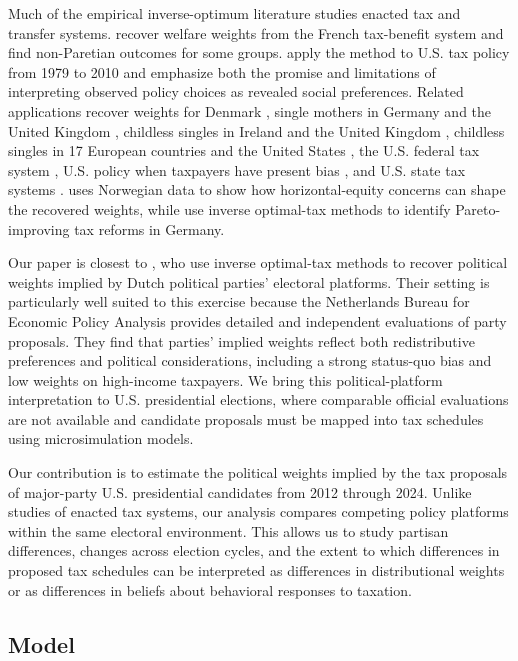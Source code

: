 \documentclass[12pt]{article}
\begin{document}
Much of the empirical inverse-optimum literature studies enacted tax and transfer systems.  \citet{BS2012} recover welfare weights from the French tax-benefit system and find non-Paretian outcomes for some groups.  \citet{LW2016} apply the method to U.S. tax policy from 1979 to 2010 and emphasize both the promise and limitations of interpreting observed policy choices as revealed social preferences.  Related applications recover weights for Denmark \citep{Petersen2007}, single mothers in Germany and the United Kingdom \citep{BBHS2009}, childless singles in Ireland and the United Kingdom \citep{BK2010}, childless singles in 17 European countries and the United States \citep{BDNPS2014}, the U.S. federal tax system \citep{Hendren2014}, U.S. policy when taxpayers have present bias \citep{Lockwood2020}, and U.S. state tax systems \citep{Embree2023}.  \citet{Berg2019} uses Norwegian data to show how horizontal-equity concerns can shape the recovered weights, while \citet{LS2020} use inverse optimal-tax methods to identify Pareto-improving tax reforms in Germany.

Our paper is closest to \citet{JJZ2017}, who use inverse optimal-tax methods to recover political weights implied by Dutch political parties' electoral platforms.  Their setting is particularly well suited to this exercise because the Netherlands Bureau for Economic Policy Analysis provides detailed and independent evaluations of party proposals.  They find that parties' implied weights reflect both redistributive preferences and political considerations, including a strong status-quo bias and low weights on high-income taxpayers.  We bring this political-platform interpretation to U.S. presidential elections, where comparable official evaluations are not available and candidate proposals must be mapped into tax schedules using microsimulation models.

Our contribution is to estimate the political weights implied by the tax proposals of major-party U.S. presidential candidates from 2012 through 2024.  Unlike studies of enacted tax systems, our analysis compares competing policy platforms within the same electoral environment.  This allows us to study partisan differences, changes across election cycles, and the extent to which differences in proposed tax schedules can be interpreted as differences in distributional weights or as differences in beliefs about behavioral responses to taxation.

\subsection{Model}
\end{document}
